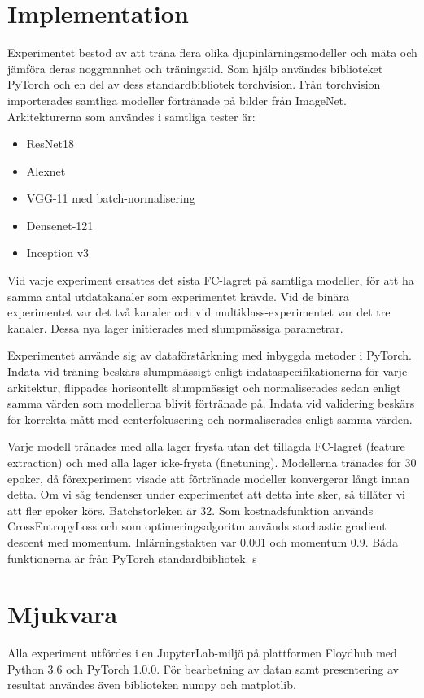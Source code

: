 \documentclass[]{kththesis}
\begin{document}
\section{Implementation}
Experimentet bestod av att träna flera olika djupinlärningsmodeller och mäta och jämföra deras noggrannhet och träningstid. Som hjälp användes biblioteket PyTorch \parencite{paszke2017automatic} och en del av dess standardbibliotek torchvision. Från torchvision importerades samtliga modeller förtränade på bilder från ImageNet. Arkitekturerna som användes i samtliga tester är:
\begin{itemize}
  \item ResNet18
  \item Alexnet
  \item VGG-11 med batch-normalisering
  \item Densenet-121
  \item Inception v3
\end{itemize}

Vid varje experiment ersattes det sista FC-lagret på samtliga modeller, för att ha samma antal utdatakanaler som experimentet krävde. Vid de binära experimentet var det två kanaler och vid multiklass-experimentet var det tre kanaler. Dessa nya lager initierades med slumpmässiga parametrar.

Experimentet använde sig av dataförstärkning med inbyggda metoder i PyTorch. Indata vid träning beskärs slumpmässigt enligt indataspecifikationerna för varje arkitektur, flippades horisontellt slumpmässigt och normaliserades sedan enligt samma värden som modellerna blivit förtränade på. Indata vid validering beskärs för korrekta mått med centerfokusering och normaliserades enligt samma värden.

Varje modell tränades med alla lager frysta utan det tillagda FC-lagret (feature extraction) och med alla lager icke-frysta (finetuning). Modellerna tränades för 30 epoker, då förexperiment visade att förtränade modeller konvergerar långt innan detta. Om vi såg tendenser under experimentet att detta inte sker, så tillåter vi att fler epoker körs. Batchstorleken är 32. Som kostnadsfunktion används CrossEntropyLoss och som optimeringsalgoritm används stochastic gradient descent med momentum. Inlärningstakten var 0.001 och momentum 0.9. Båda funktionerna är från PyTorch standardbibliotek.
s
\section{Mjukvara}
Alla experiment utfördes i en JupyterLab-miljö på plattformen Floydhub \parencite{floydhub} med Python 3.6 och PyTorch 1.0.0. För bearbetning av datan samt presentering av resultat användes även biblioteken numpy och matplotlib.
\end{document}
